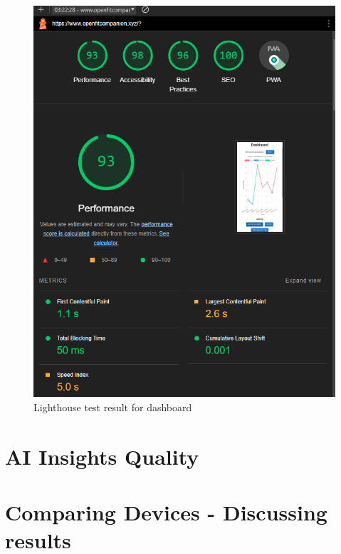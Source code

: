 \begin{figure}
    
    \centering
    \includegraphics[width=1\textwidth,keepaspectratio]{../images/lightHouseMainPage.png}
    \caption{Lighthouse test result for dashboard}
    \label{fig:lighthouse}
    
\end{figure}
\section{AI Insights Quality}
\section{Comparing Devices - Discussing results}
